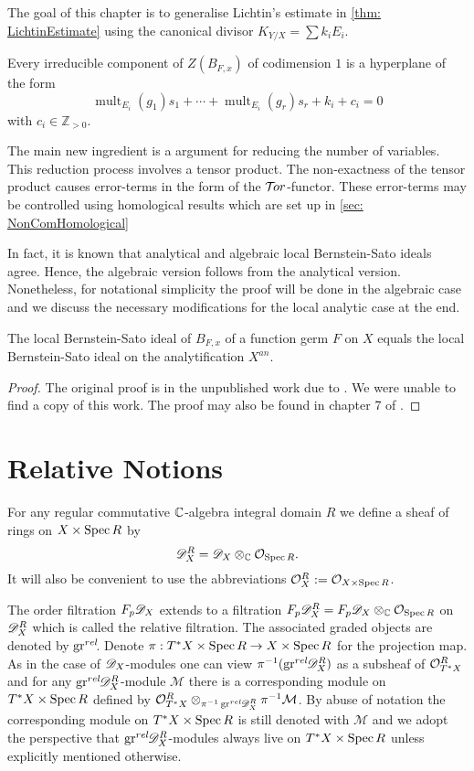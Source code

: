 The goal of this chapter is to generalise Lichtin's estimate in \cref{thm: LichtinEstimate} using the canonical divisor $K_{Y/X} = \sum k_i E_i$.
\begin{theorem}\label{thm: EstimateBernsteinSatoZeroLocust}
  Every irreducible component of $Z(B_{F,x})$ of codimension $1$ is a hyperplane of the form
  $$\operatorname{mult}_{E_i}(g_1) s_1 + \cdots + \operatorname{mult}_{E_i}(g_r)s_r + k_i + c_i=0$$
  with $c_i \in \mathbb{Z}_{> 0 }$.
\end{theorem}
The main new ingredient is a argument for reducing the number of variables.
This reduction process involves a tensor product.
The non-exactness of the tensor product causes error-terms in the form of the $\mathcal{T}\mkern -3mu or$-functor.
These error-terms may be controlled using homological results which are set up in \cref{sec: NonComHomological}

In fact, it is known that analytical and algebraic local Bernstein-Sato ideals agree.
Hence, the algebraic version follows from the analytical version.
Nonetheless, for notational simplicity the proof will be done in the algebraic case and we discuss the necessary modifications for the local analytic case at the end.
\begin{theorem}\label{thm: AnalyticAlgebraic}
  The local Bernstein-Sato ideal of $B_{F,x}$ of a function germ $F$ on $X$ equals the local Bernstein-Sato ideal on the analytification $X^{an}$.
\end{theorem}
\begin{proof}
  The original proof is in the unpublished work due to  \cite{brianccon2002remarques}.
  We were unable to find a copy of this work.
  The proof may also be found in chapter 7 of \cite{MasterThesisBSLocal}.
\end{proof}
\section{Relative Notions}
For any regular commutative $\mathbb{C}$-algebra integral domain $R$ we define a sheaf of rings on $X\times \operatorname{Spec} R$ by
$$\mathscr{D}_{X}^R = \mathscr{D}_X \otimes_{\mathbb{C}} \mathcal{O}_{\operatorname{Spec} R}.$$
It will also be convenient to use the abbreviations $\mathcal{O}_{X}^R := \mathcal{O}_{X \times \operatorname{Spec} R}$.

The order filtration $F_p\mathscr{D}_X$ extends to a filtration $F_p\mathscr{D}^R_X = F_p\mathscr{D}_X \otimes_{\mathbb{C}} \mathcal{O}_{\operatorname{Spec} R}$ on $\mathscr{D}^R_X$ which is called the relative filtration.
The associated graded objects are denoted by $\operatorname{gr}^{rel}\mkern-5mu$. Denote $\pi:T^*X\times \operatorname{Spec} R \to X\times \operatorname{Spec} R$ for the projection map.
As in the case of $\mathscr{D}_X$-modules one can view $\pi^{-1}(\operatorname{gr}^{rel}\mkern-5mu\mathscr{D}_X^R)$ as a subsheaf of $\mathcal{O}_{T^*X}^R$ and for any $\operatorname{gr}^{rel}\mkern-5mu\mathscr{D}_X^R$-module $\mathcal{M}$ there is a corresponding module on $T^*X\times \operatorname{Spec} R$ defined by $\mathcal{O}_{T^*X}^R\otimes_{\pi^{-1}\operatorname{gr}^{rel}\mkern-5mu\mathscr{D}_X^R}\pi^{-1}\mathcal{M}$.
By abuse of notation the corresponding module on $T^*X\times \operatorname{Spec} R$ is still denoted with $\mathcal{M}$ and we adopt the perspective that $\operatorname{gr}^{rel}\mkern-5mu\mathscr{D}_X^R$-modules always live on $T^*X\times \operatorname{Spec} R$ unless explicitly mentioned otherwise.

